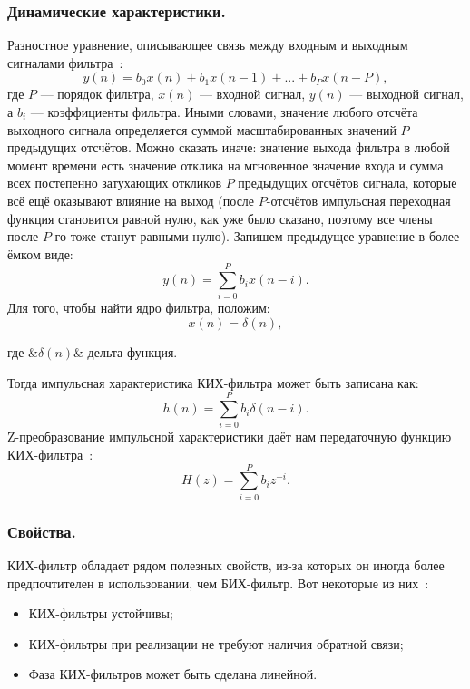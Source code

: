 \subsubsection{Динамические характеристики. }
Разностное уравнение, описывающее связь между входным и выходным сигналами фильтра~\cite{Wiki_FIR}:
\begin{equation}
	y(n) = b_0 x(n) + b_1 x(n-1) +...+ b_P x(n-P),
\end{equation}
где $P$ — порядок фильтра, $x(n)$ — входной сигнал, $y(n)$ — выходной сигнал, а $b_{i}$ — коэффициенты фильтра. Иными словами, значение любого отсчёта выходного сигнала определяется суммой масштабированных значений $P$ предыдущих отсчётов. Можно сказать иначе: значение выхода фильтра в любой момент времени есть значение отклика на мгновенное значение входа и сумма всех постепенно затухающих откликов $P$ предыдущих отсчётов сигнала, которые всё ещё оказывают влияние на выход (после $P$-отсчётов импульсная переходная функция становится равной нулю, как уже было сказано, поэтому все члены после $P$-го тоже станут равными нулю). Запишем предыдущее уравнение в более ёмком виде:
\begin{equation}
	y(n) = \sum_{i=0}^{P} b_i x(n-i).
\end{equation}
Для того, чтобы найти ядро фильтра, положим:
\begin{equation}
	x(n) = \delta(n),
\end{equation}
\begin{explanation}
	где &$\delta(n)$& дельта-функция.
\end{explanation}
Тогда импульсная характеристика КИХ-фильтра может быть записана как:
\begin{equation}
	h(n) = \sum_{i=0}^{P}b_i \delta(n-i).
\end{equation}
Z-преобразование импульсной характеристики даёт нам передаточную функцию КИХ-фильтра~\cite{Wiki_FIR}:
\begin{equation}
	H(z) = \sum_{i=0}^{P}b_i z^{-i}.
\end{equation}

\subsubsection{Свойства. }
КИХ-фильтр обладает рядом полезных свойств, из-за которых он иногда более предпочтителен в использовании, чем БИХ-фильтр. Вот некоторые из них~\cite{Wiki_FIR}:
\begin{itemize}
	\item КИХ-фильтры устойчивы;
	\item КИХ-фильтры при реализации не требуют наличия обратной связи;
	\item Фаза КИХ-фильтров может быть сделана линейной.
\end{itemize}

